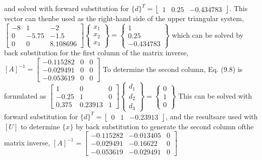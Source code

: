 \documentclass[../main.tex]{subfiles}
\begin{document}
\bigbreak
and solved with forward substitution for $\{d\}^{T}=\left\lfloor\begin{array}{lll}1 & 0.25 & -0.434783\end{array}\right\rfloor$. This vector can then\smallbreak be used as the right-hand side of the upper triangular system,
\bigbreak
$\left[\begin{array}{ccc}
-8 & 1 & -2 \\
0 & -5.75 & -1.5 \\
0 & 0 & 8.108696
\end{array}\right]\left\{\begin{array}{l}
x_{1} \\
x_{2} \\
x_{3}
\end{array}\right\}=\left\{\begin{array}{c}
1 \\
0.25 \\
-0.434783
\end{array}\right\}$
\bigbreak
which can be solved by back substitution for the first column of the matrix inverse,
\bigbreak
$[A]^{-1}=\left[\begin{array}{ccc}-0.115282 & 0 & 0 \\ -0.029491 & 0 & 0 \\ -0.053619 & 0 & 0\end{array}\right]$
\bigbreak
To determine the second column, Eq. (9.8) is formulated as
\bigbreak
$\left[\begin{array}{ccc}
1 & 0 & 0 \\
-0.25 & 1 & 0 \\
0.375 & 0.23913 & 1
\end{array}\right]\left\{\begin{array}{l}
d_{1} \\
d_{2} \\
d_{3}
\end{array}\right\}=\left\{\begin{array}{l}
0 \\
1 \\
0
\end{array}\right\}$
\bigbreak
This can be solved with forward substitution for $\{d\}^{T}=\left\lfloor\begin{array}{lll}0 & 1 & -0.23913\end{array}\right\rfloor$, and the results\smallbreak are used with $[U]$ to determine $\{x\}$ by back substitution to generate the second column of\smallbreak the matrix inverse,
\bigbreak
$[A]^{-1}=\left[\begin{array}{ccc}
-0.115282 & -0.013405 & 0 \\
-0.029491 & -0.16622 & 0 \\
-0.053619 & -0.029491 & 0
\end{array}\right]$
\end{document}
